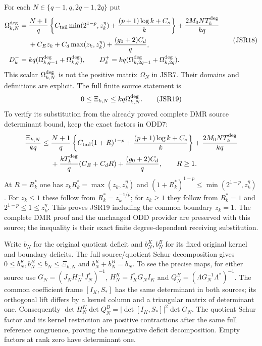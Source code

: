 \documentclass[11pt,a4paper]{article}
\begin{document}
For each $N\in\{q-1,q,2q-1,2q\}$ put
\[
\begin{aligned}
 \Omega_{k,N}^{\rm deg}={}&\frac{N+1}{q}
 \left\{C_{\rm tail}\min(2^{1-p},z_k^\eta)
       +\frac{(p+1)\log k+C_s}{k}\right\}
       +\frac{2M_0NT_k^{\rm deg}}{kq}\\
 &+C_Ez_k+C_d\max(z_k,z_k^\eta)+\frac{(g_0+2)C_d}{q},\\
 D_k^-={}&kq(\Omega_{k,q-1}^{\rm deg}+\Omega_{k,q}^{\rm deg}),\qquad
 D_k^+=kq(\Omega_{k,2q-1}^{\rm deg}+\Omega_{k,2q}^{\rm deg}).
\end{aligned}\tag{JSR18}
\]
This scalar $\Omega_{k,N}^{\rm deg}$ is not the positive
matrix $\Omega_N$ in JSR7. Their domains and definitions
are explicit. The full finite source statement is
\[
 0\leq\Xi_{k,N}\leq kq\Omega_{k,N}^{\rm deg}.
 \tag{JSR19}
\]
To verify its substitution from the already proved complete
DMR source determinant bound, keep the exact factors in ODD7:
\[
\begin{aligned}
 \frac{\Xi_{k,N}}{kq}\leq{}&\frac{N+1}{q}
 \left\{C_{\rm tail}(1+R)^{1-p}
               +\frac{(p+1)\log k+C_s}{k}\right\}
 +\frac{2M_0NT_k^{\rm deg}}{kq}\\
 &+\frac{kT_k^{\rm deg}}q(C_E+C_dR)
 +\frac{(g_0+2)C_d}{q},\qquad R\geq1.
\end{aligned}
\]
At $R=R_k^*$ one has
$z_kR_k^*=\max(z_k,z_k^\eta)$ and
$(1+R_k^*)^{1-p}\leq\min(2^{1-p},z_k^\eta)$.
For $z_k\leq1$ these follow from $R_k^*=z_k^{-1/p}$;
for $z_k\geq1$ they follow from $R_k^*=1$ and
$2^{1-p}\leq1\leq z_k^\eta$.
This proves JSR19 including the common boundary $z_k=1$.
The complete DMR proof and the unchanged ODD provider are
preserved with this source; the inequality is their exact
finite degree-dependent receiving substitution.

Write $b_N$ for the original quotient deficit and
$b_N^K,b_N^B$ for its fixed original kernel and boundary
deficits. The full source/quotient Schur decomposition gives
$0\leq b_N^K,b_N^B\leq b_N\leq\Xi_{k,N}$ and
$b_N^K+b_N^B=b_N$. To see the precise maps, for either
source use $G_N=(J_NH_N^{-1}J_N^*)^{-1}$,
$H_N^K=I_K^*G_NI_K$ and
$Q_N^B=(\Lambda G_N^{-1}\Lambda^*)^{-1}$.
The common coefficient frame $[I_K,S_*]$ has the same
determinant in both sources; its orthogonal lift differs
by a kernel column and a triangular matrix of determinant
one. Consequently
$\det H_N^K\det Q_N^B=|\det[I_K,S_*]|^2\det G_N$.
The quotient Schur factor and its kernel restriction are
positive contractions after the same full reference
congruence, proving the nonnegative deficit decomposition.
Empty factors at rank zero have determinant one.
\end{document}
